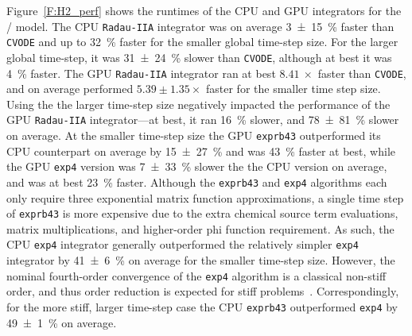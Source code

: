\documentclass[preprint]{elsarticle}
\begin{document}
Figure~\ref{F:H2_perf} shows the runtimes of the CPU and GPU integrators for the \slash{} model.
The CPU \texttt{Radau-IIA} integrator was on average \SI{3\pm15}{\percent} faster than \texttt{CVODE} and up to \SI{32}{\percent} faster for the smaller global time-step size.
For the larger global time-step, it was \SI{31\pm24}{\percent} slower than \texttt{CVODE}, although at best it was \SI{4}{\percent} faster.
The GPU \texttt{Radau-IIA} integrator ran at best $\SI{8.41}{\times}$ faster than \texttt{CVODE}, and on average performed $5.39\pm1.35\times$ faster for the smaller time step size.
Using the the larger time-step size negatively impacted the performance of the GPU \texttt{Radau-IIA} integrator---at best, it ran \SI{16}{\percent} slower, and \SI{78\pm81}{\percent} slower on average.
At the smaller time-step size the GPU \texttt{exprb43} outperformed its CPU counterpart on average by \SI{15\pm27}{\percent} and was \SI{43}{\percent} faster at best, while the GPU \texttt{exp4} version was \SI{7\pm33}{\percent} slower the the CPU version on average, and was at best \SI{23}{\percent} faster.
Although the \texttt{exprb43} and \texttt{exp4} algorithms each only require three exponential matrix function approximations, a single time step of \texttt{exprb43} is more expensive due to the extra chemical source term evaluations, matrix multiplications, and higher-order phi function requirement.
As such, the CPU \texttt{exp4} integrator generally outperformed the relatively simpler \texttt{exp4} integrator by \SI{41\pm6}{\percent} on average for the smaller time-step size.
However, the nominal fourth-order convergence of the \texttt{exp4} algorithm is a classical non-stiff order, and thus order reduction is expected for stiff problems~\cite{ANU:7701740,Bisetti:2012jw}.
Correspondingly, for the more stiff, larger time-step case the CPU \texttt{exprb43} outperformed \texttt{exp4} by \SI{49\pm1}{\percent} on average.
\end{document}
